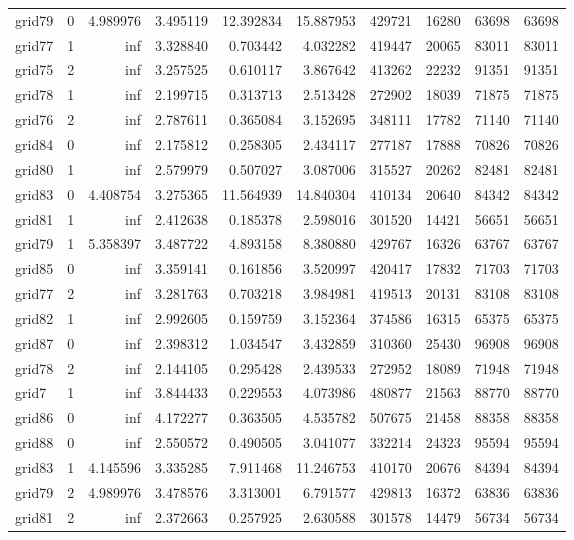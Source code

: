 \documentclass[../../../thesis.tex]{subfiles}
\begin{document}
\begin{longtable}{|l|r|r|r|r|r|r|r|r|r|}
grid79 & 0 & 4.989976 & 3.495119 & 12.392834 & 15.887953 & 429721 & 16280 & 63698 & 63698 \\
grid77 & 1 & inf & 3.328840 & 0.703442 & 4.032282 & 419447 & 20065 & 83011 & 83011 \\
grid75 & 2 & inf & 3.257525 & 0.610117 & 3.867642 & 413262 & 22232 & 91351 & 91351 \\
grid78 & 1 & inf & 2.199715 & 0.313713 & 2.513428 & 272902 & 18039 & 71875 & 71875 \\
grid76 & 2 & inf & 2.787611 & 0.365084 & 3.152695 & 348111 & 17782 & 71140 & 71140 \\
grid84 & 0 & inf & 2.175812 & 0.258305 & 2.434117 & 277187 & 17888 & 70826 & 70826 \\
grid80 & 1 & inf & 2.579979 & 0.507027 & 3.087006 & 315527 & 20262 & 82481 & 82481 \\
grid83 & 0 & 4.408754 & 3.275365 & 11.564939 & 14.840304 & 410134 & 20640 & 84342 & 84342 \\
grid81 & 1 & inf & 2.412638 & 0.185378 & 2.598016 & 301520 & 14421 & 56651 & 56651 \\
grid79 & 1 & 5.358397 & 3.487722 & 4.893158 & 8.380880 & 429767 & 16326 & 63767 & 63767 \\
grid85 & 0 & inf & 3.359141 & 0.161856 & 3.520997 & 420417 & 17832 & 71703 & 71703 \\
grid77 & 2 & inf & 3.281763 & 0.703218 & 3.984981 & 419513 & 20131 & 83108 & 83108 \\
grid82 & 1 & inf & 2.992605 & 0.159759 & 3.152364 & 374586 & 16315 & 65375 & 65375 \\
grid87 & 0 & inf & 2.398312 & 1.034547 & 3.432859 & 310360 & 25430 & 96908 & 96908 \\
grid78 & 2 & inf & 2.144105 & 0.295428 & 2.439533 & 272952 & 18089 & 71948 & 71948 \\
grid7 & 1 & inf & 3.844433 & 0.229553 & 4.073986 & 480877 & 21563 & 88770 & 88770 \\
grid86 & 0 & inf & 4.172277 & 0.363505 & 4.535782 & 507675 & 21458 & 88358 & 88358 \\
grid88 & 0 & inf & 2.550572 & 0.490505 & 3.041077 & 332214 & 24323 & 95594 & 95594 \\
grid83 & 1 & 4.145596 & 3.335285 & 7.911468 & 11.246753 & 410170 & 20676 & 84394 & 84394 \\
grid79 & 2 & 4.989976 & 3.478576 & 3.313001 & 6.791577 & 429813 & 16372 & 63836 & 63836 \\
grid81 & 2 & inf & 2.372663 & 0.257925 & 2.630588 & 301578 & 14479 & 56734 & 56734 \\

\end{longtable}
\end{document}
